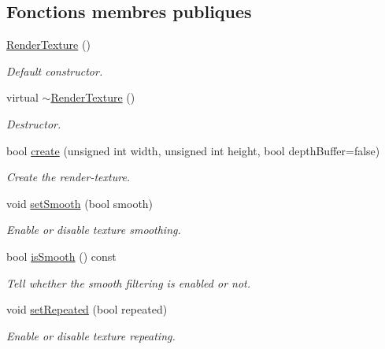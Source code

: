 \subsection*{Fonctions membres publiques}
\begin{DoxyCompactItemize}
\item 
\hyperlink{classsf_1_1RenderTexture_a19ee6e5b4c40ad251803389b3953a9c6}{Render\+Texture} ()
\begin{DoxyCompactList}\small\item\em Default constructor. \end{DoxyCompactList}\item 
\mbox{\label{classsf_1_1RenderTexture_a94b84ab9335be84d2a014c964d973304}} 
virtual \hyperlink{classsf_1_1RenderTexture_a94b84ab9335be84d2a014c964d973304}{$\sim$\+Render\+Texture} ()
\begin{DoxyCompactList}\small\item\em Destructor. \end{DoxyCompactList}\item 
bool \hyperlink{classsf_1_1RenderTexture_aefbb76eb3b87e368ab974b2660931ccb}{create} (unsigned int width, unsigned int height, bool depth\+Buffer=false)
\begin{DoxyCompactList}\small\item\em Create the render-\/texture. \end{DoxyCompactList}\item 
void \hyperlink{classsf_1_1RenderTexture_af08991e63c6020865dd07b20e27305b6}{set\+Smooth} (bool smooth)
\begin{DoxyCompactList}\small\item\em Enable or disable texture smoothing. \end{DoxyCompactList}\item 
bool \hyperlink{classsf_1_1RenderTexture_a5b43c007ab6643accc5dae84b5bc8f61}{is\+Smooth} () const
\begin{DoxyCompactList}\small\item\em Tell whether the smooth filtering is enabled or not. \end{DoxyCompactList}\item 
void \hyperlink{classsf_1_1RenderTexture_af8f97b33512bf7d5b6be3da6f65f7365}{set\+Repeated} (bool repeated)
\begin{DoxyCompactList}\small\item\em Enable or disable texture repeating. \end{DoxyCompactList}\item 

\end{DoxyCompactItemize}
